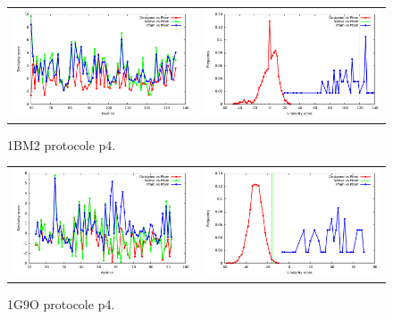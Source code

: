 \documentclass[a4paper,12pt]{article}
\begin{document}
   \begin{figure}[t]
     \centering
     \begin{tabular}{cc}
       \includegraphics[width=8.45cm]{gen_08032012/1BM2/p4/similarity_bypos.pdf} &
       \includegraphics[width=8.45cm]{gen_08032012/1BM2/p4/similarity_byseq_frequency.pdf} \\
     \end{tabular}

     \caption{1BM2 protocole p4.}
     \label{1ABO}
   \end{figure}
   \begin{figure}[t]
     \centering
     \begin{tabular}{cc}
       \includegraphics[width=8.45cm]{gen_08032012/1G9O/p4/similarity_bypos.pdf} &
       \includegraphics[width=8.45cm]{gen_08032012/1G9O/p4/similarity_byseq_frequency.pdf} \\
     \end{tabular}
     
     \caption{1G9O protocole p4.}
     \label{1ABO}
   \end{figure}
\end{document}
